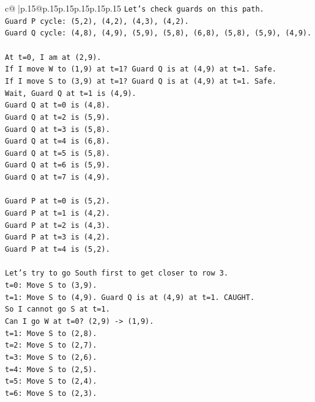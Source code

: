 \documentclass{article}
\begin{document}
{\begin{supertabular}{c@{$\;$}|p{.15\linewidth}@{}p{.15\linewidth}p{.15\linewidth}p{.15\linewidth}p{.15\linewidth}p{.15\linewidth}}
{{{\texttt{Let's check guards on this path.} \\
\texttt{Guard P cycle: (5,2), (4,2), (4,3), (4,2).} \\
\texttt{Guard Q cycle: (4,8), (4,9), (5,9), (5,8), (6,8), (5,8), (5,9), (4,9).} \\
\\ 
\texttt{At t=0, I am at (2,9).} \\
\texttt{If I move W to (1,9) at t=1? Guard Q is at (4,9) at t=1. Safe.} \\
\texttt{If I move S to (3,9) at t=1? Guard Q is at (4,9) at t=1. Safe.} \\
\texttt{Wait, Guard Q at t=1 is (4,9).} \\
\texttt{Guard Q at t=0 is (4,8).} \\
\texttt{Guard Q at t=2 is (5,9).} \\
\texttt{Guard Q at t=3 is (5,8).} \\
\texttt{Guard Q at t=4 is (6,8).} \\
\texttt{Guard Q at t=5 is (5,8).} \\
\texttt{Guard Q at t=6 is (5,9).} \\
\texttt{Guard Q at t=7 is (4,9).} \\
\\ 
\texttt{Guard P at t=0 is (5,2).} \\
\texttt{Guard P at t=1 is (4,2).} \\
\texttt{Guard P at t=2 is (4,3).} \\
\texttt{Guard P at t=3 is (4,2).} \\
\texttt{Guard P at t=4 is (5,2).} \\
\\ 
\texttt{Let's try to go South first to get closer to row 3.} \\
\texttt{t=0: Move S to (3,9).} \\
\texttt{t=1: Move S to (4,9). Guard Q is at (4,9) at t=1. CAUGHT.} \\
\texttt{So I cannot go S at t=1.} \\
\texttt{Can I go W at t=0? (2,9) {-}> (1,9).} \\
\texttt{t=1: Move S to (2,8).} \\
\texttt{t=2: Move S to (2,7).} \\
\texttt{t=3: Move S to (2,6).} \\
\texttt{t=4: Move S to (2,5).} \\
\texttt{t=5: Move S to (2,4).} \\
\texttt{t=6: Move S to (2,3).} \\
}}}
\end{supertabular}}
\end{document}

